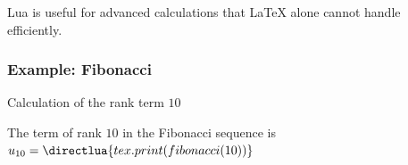 Lua is useful for advanced calculations that LaTeX alone cannot handle efficiently.

\vspace{1em}
\begin{tkzexample}[latex=.5\textwidth]
\end{tkzexample}
%

\subsubsection{Example: Fibonacci}

 \vspace{1em}
  Calculation of the rank term $10$

\vspace{1em}
\begin{tkzexample}[latex = .4\textwidth]
    The term of rank $10$ in the Fibonacci sequence
    is
    \(u_{10}=\directlua{tex.print(
    fibonacci(10))}\)
\end{tkzexample}
\endinput
